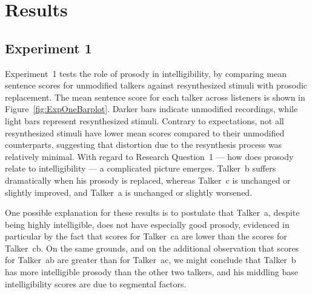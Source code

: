 \chapter{Results}

\section{Experiment 1}
Experiment~1 tests the role of prosody in intelligibility, by comparing mean sentence scores for unmodified talkers against resynthesized stimuli with prosodic replacement.  The mean sentence score for each talker across listeners is shown in Figure~\ref{fig:ExpOneBarplot}.  Darker bars indicate unmodified recordings, while light bars represent resynthesized stimuli.  Contrary to expectations, not all resynthesized stimuli have lower mean scores compared to their unmodified counterparts, suggesting that distortion due to the resynthesis process was relatively minimal.\footnotemark{}  With regard to Research Question~1 — how does prosody relate to intelligibility — a complicated picture emerges.  Talker~\ac{b} suffers dramatically when his prosody is replaced, whereas Talker~\ac{c} is unchanged or slightly improved, and Talker~\ac{a} is unchanged or slightly worsened.


One possible explanation for these results is to postulate that Talker~\ac{a}, despite being highly intelligible, does not have especially good prosody, evidenced in particular by the fact that scores for Talker~\ac{ca} are lower than the scores for Talker~\ac{cb}.  On the same grounds, and on the additional observation that scores for Talker~\ac{ab} are greater than for Talker~\ac{ac}, we might conclude that Talker~\ac{b} has more intelligible prosody than the other two talkers, and his middling base intelligibility scores are due to segmental factors.

